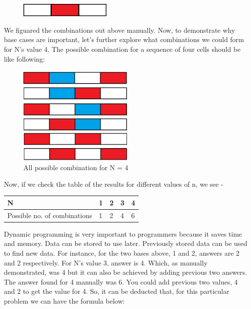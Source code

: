 \documentclass[12pt]{article}
\begin{document}
{\begin{figure}[H]
\includegraphics[width=0.40\textwidth]{wrw.png}
\end{figure}
We figuared the combinations out above manually. Now, to demonstrate why base cases are important, let’s further explore what combinations we could form for N’s value 4.\vspace{3mm}\newline
 The possible combination for a sequence of four cells should be like following:
\begin{figure}[H]
\centering
\includegraphics[width=0.50\textwidth]{n4wrb.png}
\caption{All possible combination for N = 4}
\end{figure}
Now, if we check the table of the results for different values of n, we see -
\begin{center}
\begin{tabu} to 1.0\textwidth { | X[2.8] | X[.8] | X[.8] | X[.8]|X[.8]|}
 \hline
 N&1&2&3&4\\
 \hline
 Possible no. of combinations&1&2&4&6 \\
\hline
\end{tabu}
\end{center}
\vspace{6mm}
Dynamic programming is very important to programmers because it saves time and memory. Data can be stored to use later. Previously stored data can be used to find new data. For instance, for the two bases above, 1 and 2, answers are 2 and 2 respectively.  For N’s value 3, answer is 4. Which, as manually demonstrated, was 4 but it  can  also be achieved by adding previous two answers. The answer found for 4 manually was 6. You could add previous two values, 4 and 2 to get the value for 4.\vspace{8mm}\newline
So, it can be deducted that, for this particular problem we can have the formula below:
}
\end{document}
